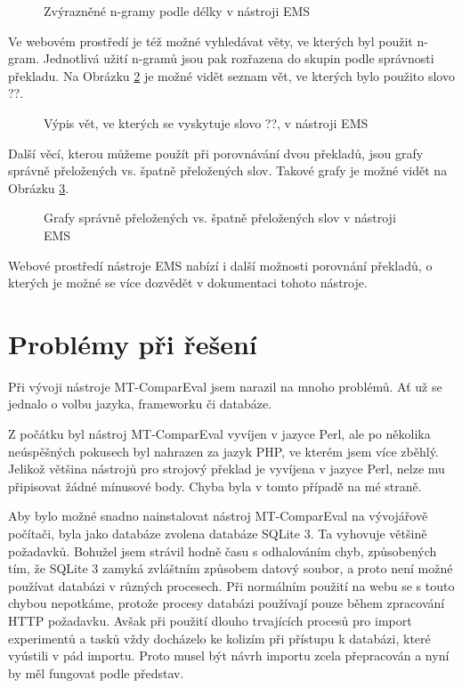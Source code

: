 \begin{figure}
  \caption{Zvýrazněné n-gramy podle délky v nástroji EMS}
  \label{img:ems-sentence}
\end{figure}

Ve webovém prostředí je též možné vyhledávat věty,
  ve kterých byl použit n-gram.
Jednotlivá užití n-gramů jsou pak rozřazena do skupin podle správnosti překladu.
Na Obrázku \ref{img:ems-word} je možné vidět seznam vět,
  ve kterých bylo použito slovo ??.

\begin{figure}
  \caption{Výpis vět, ve kterých se vyskytuje slovo ??, v nástroji EMS}
  \label{img:ems-word}
\end{figure}

Další věcí, kterou můžeme použít při porovnávání dvou překladů,
  jsou grafy správně přeložených vs. špatně přeložených slov.
Takové grafy je možné vidět na Obrázku \ref{img:ems-charts}.

\begin{figure}
  \caption{Grafy správně přeložených vs. špatně přeložených slov v nástroji EMS}
  \label{img:ems-charts}
\end{figure}

Webové prostředí nástroje EMS nabízí i další možnosti porovnání překladů,
  o kterých je možné se více dozvědět v dokumentaci tohoto nástroje.

\section{Problémy při řešení}
Při vývoji nástroje MT-ComparEval jsem narazil na mnoho problémů.
Ať už se jednalo o volbu jazyka, frameworku či databáze.

Z počátku byl nástroj MT-ComparEval vyvíjen v jazyce Perl,
  ale po několika neúspěšných pokusech byl nahrazen za jazyk PHP,
  ve kterém jsem více zběhlý.
Jelikož většina nástrojů pro strojový překlad je vyvíjena v jazyce Perl,
  nelze mu připisovat žádné mínusové body.
Chyba byla v tomto případě na mé straně.

Aby bylo možné snadno nainstalovat nástroj MT-ComparEval na vývojářově počítači,
  byla jako databáze zvolena databáze SQLite 3.
Ta vyhovuje většině požadavků.
Bohužel jsem strávil hodně času s odhalováním chyb,
  způsobených tím,
  že SQLite 3 zamyká zvláštním způsobem datový soubor,
  a proto není možné používat databázi v různých procesech.
Při normálním použití na webu se s touto chybou nepotkáme,
  protože procesy databázi používají pouze během zpracování HTTP požadavku.
Avšak při použití dlouho trvajících procesů pro import experimentů a tasků
  vždy docházelo ke kolizím při přístupu k databázi,
  které vyústili v pád importu.
Proto musel být návrh importu zcela přepracován a nyní by měl fungovat podle představ.


